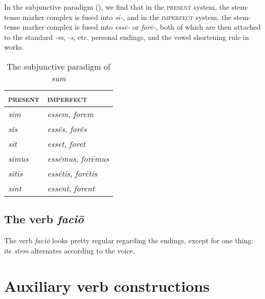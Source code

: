 \documentclass[a4paper, oneside, 12pt]{report}
\newcommand{\form}[1]{\emph{#1}}
\newcommand*{\category}[1]{\textsc{#1}}
\begin{document}
In the subjunctive paradigm (),
we find that in the \category{present} system, 
the stem-tense marker complex is fused into \form{sī-},
and in the \category{imperfect} system,
the stem-tense marker complex is fused into \form{ess\={e}-} or \form{for\={e}-},
both of which are then attached to the standard \form{-m}, \form{-s}, etc. 
personal endings, 
and the vowel shortening rule in  works.

\begin{table}[H]
    \caption{The subjunctive paradigm of \form{sum}}
    \centering
    \label{tbl:subjunctive-sum}
    \begin{tabular}{ll}
    \toprule
    \category{present}   & \category{imperfect}   \\ \midrule
    \form{sim}       & \form{essem}, \form{forem}       \\
    \form{sīs}   & \form{ess\={e}s}, \form{for\={e}s}   \\
    \form{sit}       & \form{esset}, \form{foret}       \\
    \form{sīmus} & \form{ess\={e}mus}, \form{for\={e}mus} \\
    \form{sītis} & \form{ess\={e}tis}, \form{for\={e}tis} \\
    \form{sint}      & \form{essent}, \form{forent}     \\ \bottomrule
    \end{tabular}
\end{table}

\subsection{The verb \form{faci\={o}}}

The verb \form{faci\={o}} looks pretty regular
regarding the endings, 
except for one thing: 
its \emph{stem} alternates according to the voice.

\section{Auxiliary verb constructions}
\end{document}
